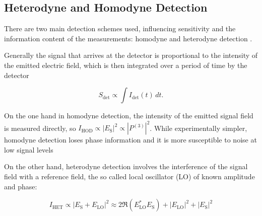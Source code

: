 





\subsection{Heterodyne and Homodyne Detection}
\label{subsec:heterodyne_homodyne}

\noindent There are two main detection schemes used, influencing sensitivity and the information content of the measurements: homodyne and heterodyne detection \cite{abramaviciusetal2009coherentmultidimensionaloptical}.

\noindent
Generally the signal that arrives at the detector is proportional to the intensity of the emitted electric field, which is then integrated over a period of time by the detector

\begin{equation}
	S_{\text{det}} \propto \int I_{\text{det}}(t) \, dt.
	\label{eq:signal_intensity}
\end{equation}

\noindent On the one hand in homodyne detection, the intensity of the emitted signal field is measured directly, so $ I_{\text{HOD}} \propto |E_{\text{S}}|^2 \propto |P^{(3)}|^2 $. While experimentally simpler, homodyne detection loses phase information and it is more susceptible to noise at low signal levels %

\noindent On the other hand, heterodyne detection involves the interference of the signal field with a reference field, the so called local oscillator (LO) of known amplitude and phase:

\begin{equation}
	I_{\text{HET}} \propto |E_{\text{S}} + E_{\text{LO}}|^2 \approx 2\Re{(E_{\text{LO}}^*E_{\text{S}})} + |E_{\text{LO}}|^2 + |E_{\text{S}}|^2
	\label{eq:heterodyne}
\end{equation}

